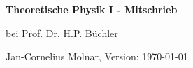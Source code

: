 \documentclass[paper=a5,fleqn,DIV=calc]{scrartcl}
\theoremstyle{graymarginwithblueheader}
\theoremstyle{yellowheader}
\theoremstyle{graymarginwithitblackheader}
\theoremstyle{graymarginwithblueheadern}
\theoremstyle{graymarginwithyellowheadern}
\theoremstyle{graymarginwithitblackheadern}
\begin{document}
\begin{center}
{\huge\bf Theoretische Physik I - Mitschrieb}

bei Prof. Dr. H.P. Büchler

Jan-Cornelius Molnar, Version: \today\ \thistime
\end{center}

\tableofcontents

\newpage


\newpage


\newpage


\newpage


\newpage


\newpage


\newpage

\end{document}
